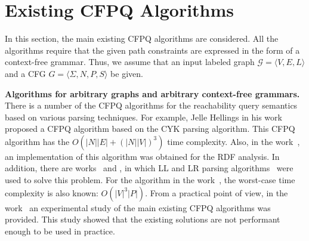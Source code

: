 \section{Existing CFPQ Algorithms}\label{sec:ch1/sec5}
In this section, the main existing CFPQ algorithms are considered. All the algorithms require that the given path constraints are expressed in the form of a context-free grammar. Thus, we assume that an input labeled graph $\mathcal{G} = \langle V, E, L \rangle$ and a CFG $G = \langle \Sigma, N, P, S \rangle$ be given.

\textbf{Algorithms for arbitrary graphs and arbitrary context-free grammars.} There is a number of the CFPQ algorithms for the reachability query semantics based on various parsing techniques. For example, Jelle Hellings in his work~\cite{hellings2014conjunctive} proposed a CFPQ algorithm based on the CYK parsing algorithm. This CFPQ algorithm has the $O(|N||E| + (|N||V|)^3)$ time complexity. Also, in the work~\cite{zhang2016context}, an implementation of this algorithm was obtained for the RDF analysis. In addition, there are works~\cite{medeiros2018efficient} and \cite{santos2018bottom}, in which LL and LR parsing algorithms~\cite{aho1973theory} were used to solve this problem. For the algorithm in the work~\cite{medeiros2018efficient}, the worst-case time complexity is also known: $O(|V|^3 |P|)$. From a practical point of view, in the work~\cite{kuijpers2019experimental} an experimental study of the main existing CFPQ algorithms was provided. This study showed that the existing solutions are not performant enough to be used in practice.

